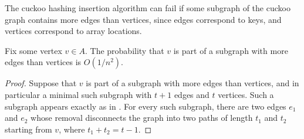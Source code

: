 \documentclass{patmorin}
\begin{document}
The cuckoo hashing insertion algorithm can fail if some subgraph of
the cuckoo graph contains more edges than vertices, since edges
correspond to keys, and vertices correspond to array locations.
\begin{lem}
  Fix some vertex $v \in A$. The probability that $v$ is part of a
  subgraph with more edges than vertices is $O(1/n^2)$.
\end{lem}
\begin{proof}
  Suppose that $v$ is part of a subgraph with more edges than
  vertices, and in particular a minimal such subgraph with $t + 1$
  edges and $t$ vertices. Such a subgraph appears exactly as in
  . For every such subgraph, there are two edges
  $e_1$ and $e_2$ whose removal disconnects the graph into two paths
  of length $t_1$ and $t_2$ starting from $v$, where
  $t_1 + t_2 = t - 1$.


\end{proof}
\end{document}
